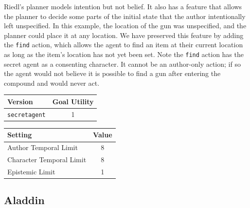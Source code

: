 \documentclass{nilreport}
\begin{document}
Riedl's planner models intention but not belief. It also has a feature
that allows the planner to decide some parts of the initial state
that the author intentionally left unspecified. In this example, the
location of the gun was unspecified, and the planner could place it
at any location. We have preserved this feature by adding the \texttt{find}
action, which allows the agent to find an item at their current location
as long as the item's location has not yet been set. Note the \texttt{find}
action has the secret agent as a consenting character. It cannot be
an author-only action; if so the agent would not believe it is possible
to find a gun after entering the compound and would never act.

\medskip{}
\noindent{}

\medskip{}

\begin{center}
\begin{tabular}[t]{|l|c|}
\hline 
\textbf{Version} & \textbf{Goal Utility}\tabularnewline
\hline 
\hline 
\texttt{secretagent} & 1\tabularnewline
\hline 
\end{tabular}\textbf{\quad{}}%
\begin{tabular}[t]{|l|c|}
\hline 
\textbf{Setting} & \textbf{Value}\tabularnewline
\hline 
\hline 
Author Temporal Limit & 8\tabularnewline
\hline 
Character Temporal Limit & 8\tabularnewline
\hline 
Epistemic Limit & 1\tabularnewline
\hline 
\end{tabular}
\par\end{center}

\subsection{Aladdin}
\end{document}
